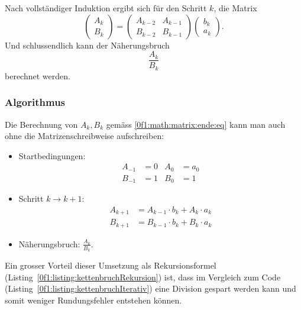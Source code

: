 Nach vollständiger Induktion ergibt sich für den Schritt $k$, die Matrix
\begin{equation}
	\label{0f1:math:matrix:ende:eq}
	 \begin{pmatrix}
		A_{k}\\
		B_{k}			
	\end{pmatrix} 
	=
		\begin{pmatrix}
		A_{k-2}& A_{k-1}\\
		B_{k-2}& B_{k-1}			
	\end{pmatrix}
		\begin{pmatrix}
		b_k\\
		a_k
	\end{pmatrix}.
\end{equation}
Und schlussendlich kann der Näherungsbruch
\[
\frac{A_k}{B_k}
\] 
berechnet werden.

\subsubsection{Algorithmus}
Die Berechnung von $A_k, B_k$ gemäss \eqref{0f1:math:matrix:ende:eq} kann man auch ohne die Matrizenschreibweise \cite{0f1:kettenbrueche} aufschreiben:
\begin{itemize}
\item Startbedingungen:
\begin{align*}
A_{-1} &= 0		&		A_0 &= a_0 \\
B_{-1} &= 1		&		B_0 &= 1 
\end{align*}
\item Schritt $k\to k+1$:
\[
\begin{aligned}
\label{0f1:math:loesung:eq}
A_{k+1} &= A_{k-1} \cdot b_k + A_k \cdot a_k \\
B_{k+1} &= B_{k-1} \cdot b_k + B_k \cdot a_k
\end{aligned}
\]
\item
Näherungsbruch: \qquad$\displaystyle\frac{A_k}{B_k}$.
\end{itemize}
Ein grosser Vorteil dieser Umsetzung
als Rekursionsformel
(Listing~\ref{0f1:listing:kettenbruchRekursion}) ist,
dass im Vergleich zum Code (Listing~\ref{0f1:listing:kettenbruchIterativ})
eine Division gespart werden kann und somit weniger Rundungsfehler
entstehen können.


